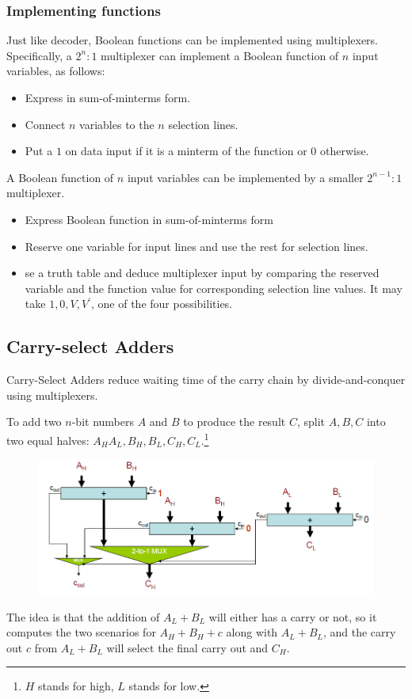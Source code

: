 \documentclass[12pt]{article}
\theoremstyle{definition}
\begin{document}
\subsubsection{Implementing functions}
Just like decoder, Boolean functions can be implemented using multiplexers. Specifically, a $2^n:1$ multiplexer can implement a Boolean function of $n$ input variables, as follows:
\begin{itemize}
  \item Express in sum-of-minterms form.
  \item Connect $n$ variables to the $n$ selection lines.
  \item Put a $1$ on data input if it is a minterm of the function or $0$ otherwise.
\end{itemize}
A Boolean function of $n$ input variables can be implemented by a smaller $2^{n-1}:1$ multiplexer.
\begin{itemize}
  \item Express Boolean function in sum-of-minterms form
  \item Reserve one variable for input lines and use the rest for selection lines.
  \item se a truth table and deduce multiplexer input by comparing the reserved variable and the function value for corresponding selection line values. It may take $1, 0, V, V^\prime$, one of the four possibilities.
\end{itemize}
\subsection{Carry-select Adders}
Carry-Select Adders reduce waiting time of the carry chain by divide-and-conquer using multiplexers.

To add two $n$-bit numbers $A$ and $B$ to produce the result $C$, split $A, B, C$ into two equal halves: $A_H A_L, B_H, B_L, C_H,C_L$.\footnote{$H$ stands for high, $L$ stands for low.}
\begin{figure}[h]
\centering
\includegraphics[width = \textwidth]{7_9.png}
\end{figure}
The idea is that the addition of $A_L + B_L$ will either has a carry or not, so it computes the two scenarios for $A_H+B_H+c$ along with $A_L+B_L$, and the carry out $c$ from $A_L+B_L$ will select the final carry out and $C_H$.
\end{document}

